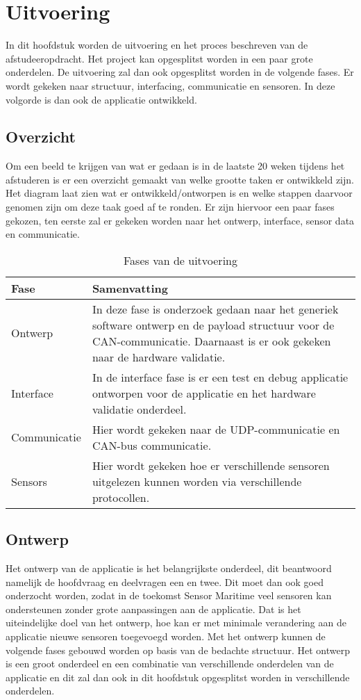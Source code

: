 \chapter{Uitvoering}
In dit hoofdstuk worden de uitvoering en het proces beschreven van de afstudeeropdracht. Het project kan opgesplitst worden in een paar grote onderdelen. De uitvoering zal dan ook opgesplitst worden in de volgende fases. Er wordt gekeken naar structuur, interfacing, communicatie en sensoren. In deze volgorde is dan ook de applicatie ontwikkeld.

\section{Overzicht}
Om een beeld te krijgen van wat er gedaan is in de laatste 20 weken tijdens het afstuderen is er een overzicht gemaakt van welke grootte taken er ontwikkeld zijn. Het diagram laat zien wat er ontwikkeld/ontworpen is en welke stappen daarvoor genomen zijn om deze taak goed af te ronden. Er zijn hiervoor een paar fases gekozen, ten eerste zal er gekeken worden naar het ontwerp, interface, sensor data en communicatie.

\begin{table}[h!]
	\centering
	\caption{Fases van de uitvoering}
	\label{tab:UitvoeringOverzicht}
	\begin{tabular}{lp{13cm}}
	\toprule
	\textbf{Fase} & \textbf{Samenvatting} \\ \midrule
	Ontwerp 				& In deze fase is onderzoek gedaan naar het generiek software ontwerp en de payload structuur voor de CAN-communicatie. Daarnaast is er ook gekeken naar de hardware validatie. \\
	Interface 				& In de interface fase is er een test en debug applicatie ontworpen voor de applicatie en het hardware validatie onderdeel. 	\\
	Communicatie 			& Hier wordt gekeken naar de UDP-communicatie en CAN-bus communicatie.												\\
	Sensors  				& Hier wordt gekeken hoe er verschillende sensoren uitgelezen kunnen worden via verschillende protocollen.			\\ \bottomrule
	\end{tabular}
\end{table}

\newpage
\section{Ontwerp}
Het ontwerp van de applicatie is het belangrijkste onderdeel, dit beantwoord namelijk de hoofdvraag en deelvragen een en twee. Dit moet dan ook goed onderzocht worden, zodat in de toekomst Sensor Maritime veel sensoren kan ondersteunen zonder grote aanpassingen aan de applicatie. Dat is het uiteindelijke doel van het ontwerp, hoe kan er met minimale verandering aan de applicatie nieuwe sensoren toegevoegd worden. Met het ontwerp kunnen de volgende fases gebouwd worden op basis van de bedachte structuur. Het ontwerp is een groot onderdeel en een combinatie van verschillende onderdelen van de applicatie en dit zal dan ook in dit hoofdstuk opgesplitst worden in verschillende onderdelen.

